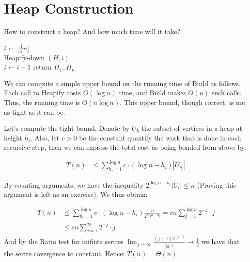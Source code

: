 \ifdefined\Book

\section{Heap Construction} How to construct a heap? And how much time will it take?   

\begin{algorithm}[H]
  $ i \leftarrow \lfloor \frac{1}{2}n  \rfloor $ \\
  { 
    Heapify-down $\left( H, i \right)$ \\ 
    $ i \leftarrow i - 1 $  
  }
return $H_{1} .. H_{n}$
\caption{ Build a heap. } 
\end{algorithm}
We can compute a simple upper bound on the running time of Build as follows. Each call to Heapify costs $O(\log n)$ time, and Build makes $O(n)$ such calls. Thus, the running time is $O(n \log n)$. This upper bound, though correct, is not as tight as it can be.

Let's compute the tight bound. Denote by $U_h$ the subset of vertices in a heap at height $h_{i}$. Also, let $c > 0 $ be the constant quantify the work that is done in each recursive step, then we can express the total cost as being bonded from above by: 

\begin{equation*}
  \begin{split}
    T\left( n \right) & \le \sum_{ h_{i} =1}^{ \log n }{c \cdot \left( \log n -  h_{i} \right)  |U_{h_{i}}|   } 
  \end{split}
\end{equation*}

By counting arguments, we have the inequality $ 2^{\log n - h_{i}}|U_{i}| \le n $ (Proving this argument is left as an exercise). We thus obtain:  

\begin{equation*}
  \begin{split}
    T\left( n \right)  & \le  \sum_{ h_{i} =1}^{ \log n }{c \cdot \left( \log n -  h_{i} \right) \frac{n}{2^{log n - h_{i}} }} = c n \sum_{ j = 1}^{ \log n }{ 2^{-j} \cdot j  }  \\ 
      & \le   c n \sum_{ j = 1}^{ \infty }{ 2^{-j} \cdot j  } 
  \end{split}
\end{equation*}
And by the Ratio test for inifinte serires $ \lim_{j\rightarrow \infty} \frac{(j+1)2^{-j-1}}{j2^{-j}} \rightarrow \frac{1}{2}$ we have that the serire covergence to constant. Hence: $ T\left( n \right) = \Theta\left( n \right) $. 


